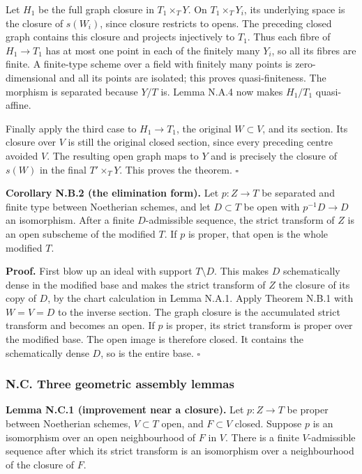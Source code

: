 \documentclass[11pt]{article}
\begin{document}
Let \(H_1\) be the full graph closure in \(T_1\times_T Y\). On
\(T_1\times_T Y_i\), its underlying space is the closure of \(s(W_i)\),
since closure restricts to opens. The preceding closed graph contains
this closure and projects injectively to \(T_1\). Thus each fibre of
\(H_1\to T_1\) has at most one point in each of the finitely many
\(Y_i\), so all its fibres are finite. A finite-type scheme over a field
with finitely many points is zero-dimensional and all its points are
isolated; this proves quasi-finiteness. The morphism is separated
because \(Y/T\) is. Lemma N.A.4 now makes \(H_1/T_1\) quasi-affine.

Finally apply the third case to \(H_1\to T_1\), the original
\(W\subset V\), and its section. Its closure over \(V\) is still the
original closed section, since every preceding centre avoided \(V\). The
resulting open graph maps to \(Y\) and is precisely the closure of
\(s(W)\) in the final \(T'\times_T Y\). This proves the theorem.
\(\square\)

\textbf{Corollary N.B.2 (the elimination form).} Let \(p:Z\to T\) be
separated and finite type between Noetherian schemes, and let
\(D\subset T\) be open with \(p^{-1}D\to D\) an isomorphism. After a
finite \(D\)-admissible sequence, the strict transform of \(Z\) is an
open subscheme of the modified \(T\). If \(p\) is proper, that open is
the whole modified \(T\).

\textbf{Proof.} First blow up an ideal with support \(T\setminus D\).
This makes \(D\) schematically dense in the modified base and makes the
strict transform of \(Z\) the closure of its copy of \(D\), by the chart
calculation in Lemma N.A.1. Apply Theorem N.B.1 with \(W=V=D\) to the
inverse section. The graph closure is the accumulated strict transform
and becomes an open. If \(p\) is proper, its strict transform is proper
over the modified base. The open image is therefore closed. It contains
the schematically dense \(D\), so is the entire base. \(\square\)

\subsubsection{N.C. Three geometric assembly
lemmas}\label{n.c.-three-geometric-assembly-lemmas}

\textbf{Lemma N.C.1 (improvement near a closure).} Let \(p:Z\to T\) be
proper between Noetherian schemes, \(V\subset T\) open, and
\(F\subset V\) closed. Suppose \(p\) is an isomorphism over an open
neighbourhood of \(F\) in \(V\). There is a finite \(V\)-admissible
sequence after which its strict transform is an isomorphism over a
neighbourhood of the closure of \(F\).
\end{document}
